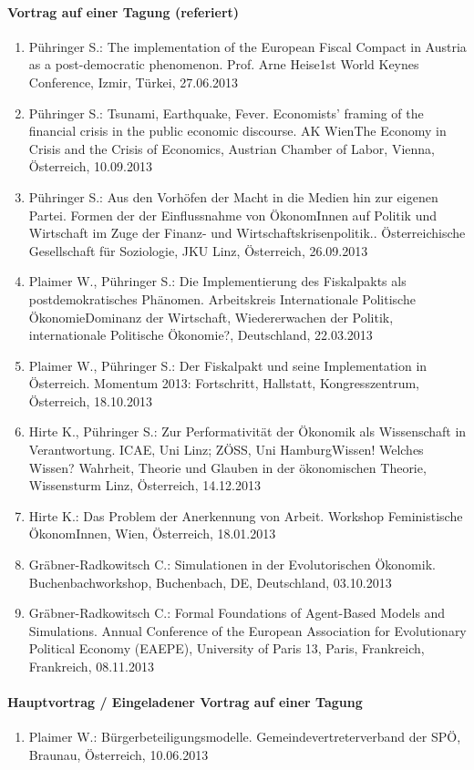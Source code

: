 \paragraph{Vortrag auf einer Tagung (referiert)}
\begin{enumerate}
	\item Pühringer S.: The implementation of the European Fiscal Compact in Austria as a post-democratic phenomenon. Prof. Arne Heise1st World Keynes Conference, Izmir, Türkei, 27.06.2013
	\item Pühringer S.: Tsunami, Earthquake, Fever. Economists’ framing of the financial crisis in the public economic discourse. AK WienThe Economy in Crisis and the Crisis of Economics, Austrian Chamber of Labor, Vienna, Österreich, 10.09.2013
	\item Pühringer S.: Aus den Vorhöfen der Macht in die Medien hin zur eigenen Partei. Formen der der Einflussnahme von ÖkonomInnen auf Politik und Wirtschaft im Zuge der Finanz- und Wirtschaftskrisenpolitik.. Österreichische Gesellschaft für Soziologie, JKU Linz, Österreich, 26.09.2013
	\item Plaimer W., Pühringer S.: Die Implementierung des Fiskalpakts als postdemokratisches Phänomen. Arbeitskreis Internationale Politische ÖkonomieDominanz der Wirtschaft, Wiedererwachen der Politik, internationale Politische Ökonomie?, Deutschland, 22.03.2013
	\item Plaimer W., Pühringer S.: Der Fiskalpakt und seine Implementation in Österreich. Momentum 2013: Fortschritt, Hallstatt, Kongresszentrum, Österreich, 18.10.2013
	\item Hirte K., Pühringer S.: Zur Performativität der Ökonomik als Wissenschaft in Verantwortung. ICAE, Uni Linz; ZÖSS, Uni HamburgWissen! Welches Wissen? Wahrheit, Theorie und Glauben in der ökonomischen Theorie, Wissensturm Linz, Österreich, 14.12.2013
	\item Hirte K.: Das Problem der Anerkennung von Arbeit. Workshop Feministische ÖkonomInnen, Wien, Österreich, 18.01.2013
	\item Gräbner-Radkowitsch C.: Simulationen in der Evolutorischen Ökonomik. Buchenbachworkshop, Buchenbach, DE, Deutschland, 03.10.2013
	\item Gräbner-Radkowitsch C.: Formal Foundations of Agent-Based Models and Simulations. Annual Conference of the European Association for Evolutionary Political Economy (EAEPE), University of Paris 13, Paris, Frankreich, Frankreich, 08.11.2013
\end{enumerate}
\paragraph{Hauptvortrag / Eingeladener Vortrag auf einer Tagung}
\begin{enumerate}
	\item Plaimer W.: Bürgerbeteiligungsmodelle. Gemeindevertreterverband der SPÖ, Braunau, Österreich, 10.06.2013
\end{enumerate}
